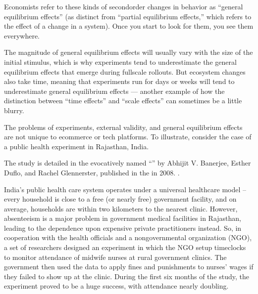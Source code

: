 \documentclass[letterpaper,10pt,english]{jupyterBook}
\begin{document}
\sphinxAtStartPar
Economists refer to these kinds of second\sphinxhyphen{}order changes in behavior as “general equilibrium effects” (as distinct from “partial equilibrium effects,” which refers to the  effect of a change in a system). Once you start to look for them, you see them everywhere.

\sphinxAtStartPar
The magnitude of general equilibrium effects will usually vary with the size of the initial stimulus, which is why experiments tend to underestimate the general equilibrium effects that emerge during full\sphinxhyphen{}scale rollouts. But ecosystem changes also take time, meaning that experiments run for days or weeks will tend to underestimate general equilibrium effects — another example of how the distinction between “time effects” and “scale effects” can sometimes be a little blurry.

\sphinxAtStartPar
The problems of experiments, external validity, and general equilibrium effects are not unique to e\sphinxhyphen{}commerce or tech platforms. To illustrate, consider the case of a public health experiment in Rajasthan, India.%
\begin{footnote}[2]\sphinxAtStartFootnote
The study is detailed in the evocatively named “” by Abhijit V. Banerjee, Esther Duflo, and Rachel Glennerster, published in the  in 2008. .
%
\end{footnote} India’s public health care system operates under a universal healthcare model – every household is close to a free (or nearly free) government facility, and on average, households are within two kilometers to the nearest clinic. However, absenteeism is a major problem in government medical facilities in Rajasthan, leading to the dependence upon expensive private practitioners instead. So, in cooperation with the health officials and a nongovernmental organization (NGO), a set of researchers designed an experiment in which the NGO setup timeclocks to monitor attendance of midwife nurses at rural government clinics. The government then used the data to apply fines and punishments to nurses’ wages if they failed to show up at the clinic. During the first six months of the study, the experiment proved to be a huge success, with attendance nearly doubling.
\end{document}
